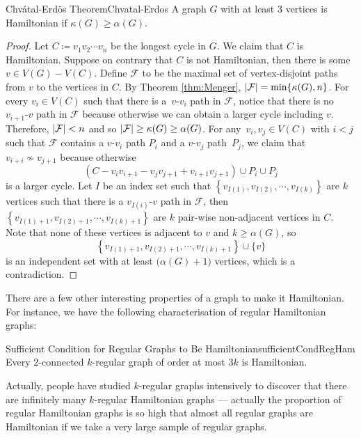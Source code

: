 \documentclass[math]{amznotes}
\theoremstyle{remark}
\begin{document}
\begin{thmbox}{Chv\'{a}tal-Erd\"{o}s Theorem}{Chvatal-Erdos}
    A graph $G$ with at least $3$ vertices is Hamiltonian if $\kappa(G) \geq \alpha(G)$.
    \tcblower
    \begin{proof}
        Let $C \coloneqq v_1v_2\cdots v_n$ be the longest cycle in $G$. We claim that $C$ is Hamiltonian. Suppose on contrary that $C$ is not Hamiltonian, then there is some $v \in V(G) - V(C)$. Define $\mathcal{F}$ to be the maximal set of vertex-disjoint paths from $v$ to the vertices in $C$. By Theorem \ref{thm:Menger}, ${\left\lvert {\mathcal{F}} \right\rvert} = \min\{\kappa(G), n\}$. For every $v_i \in V(C)$ such that there is a~$v$-$v_i$ path in $\mathcal{F}$, notice that there is no $v_{i + 1}$-$v$ path in $\mathcal{F}$ because otherwise we can obtain a larger cycle including $v$. Therefore, ${\left\lvert {\mathcal{F}} \right\rvert} < n$ and so ${\left\lvert {\mathcal{F}} \right\rvert} \geq \kappa(G) \geq \alpha(G)$. For any~$v_i, v_j \in V(C)$ with $i < j$ such that $\mathcal{F}$ contains a $v$-$v_i$ path $P_i$ and a $v$-$v_j$ path~$P_j$, we claim that $v_{i + i} \not\sim v_{j + 1}$ because otherwise 
        \begin{equation*}
            \left(C - v_iv_{i + 1} - v_jv_{j + 1} + v_{i + 1}v_{j + 1}\right) \cup P_i \cup P_j
        \end{equation*}
        is a larger cycle. Let $I$ be an index set such that $\left\{v_{I(1)}, v_{I(2)}, \cdots, v_{I(k)}\right\}$ are $k$ vertices such that there is a $v_{I(i)}$-$v$ path in $\mathcal{F}$, then $\left\{v_{I(1) + 1}, v_{I(2) + 1}, \cdots, v_{I(k) + 1}\right\}$ are $k$ pair-wise non-adjacent vertices in $C$. Note that none of these vertices is adjacent to $v$ and $k \geq \alpha(G)$, so 
        \begin{equation*}
            \left\{v_{I(1) + 1}, v_{I(2) + 1}, \cdots, v_{I(k) + 1}\right\} \cup \{v\}
        \end{equation*}
        is an independent set with at least $\bigl(\alpha(G) + 1\bigr)$ vertices, which is a contradiction.
    \end{proof}
\end{thmbox}
There are a few other interesting properties of a graph to make it Hamiltonian. For instance, we have the following characterisation of regular Hamiltonian graphs:
\begin{probox}{Sufficient Condition for Regular Graphs to Be Hamiltonian}{sufficientCondRegHam}
    Every $2$-connected $k$-regular graph of order at most $3k$ is Hamiltonian.
\end{probox}
Actually, people have studied $k$-regular graphs intensively to discover that there are infinitely many $k$-regular Hamiltonian graphs --- actually the proportion of regular Hamiltonian graphs is so high that almost all regular graphs are Hamiltonian if we take a very large sample of regular graphs.
\end{document}

